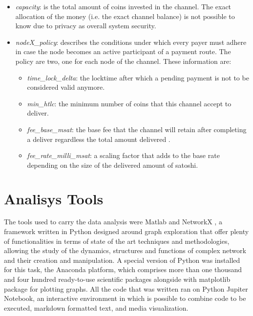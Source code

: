 	\begin{itemize}
		\item \textit{capacity}: is the total amount of coins invested in the channel. The exact allocation of the money (i.e. the exact channel balance) is not possible to know due to privacy as overall system security.
		
		\item \textit{nodeX\_policy}: describes the conditions under which every payer must adhere in case the node becomes an active participant of a payment route. The policy are two, one for each node of the channel. These information are:
		\begin{itemize}
			\item \textit{time\_lock\_delta}: the locktime after which a pending payment is not to be considered valid anymore.
			
			\item \textit{min\_htlc}: the minimum number of coins that this channel accept to deliver.
			
			\item \textit{fee\_base\_msat}: the base fee that the channel will retain after completing a deliver regardless the total amount delivered .
			
			\item \textit{fee\_rate\_milli\_msat}: a scaling factor that adds to the base rate depending on the size of the delivered amount of satoshi.
		\end{itemize}
	\end{itemize}
	
	
	\section{Analisys Tools}
	
	The tools used to carry the data analysis were Matlab and NetworkX \cite{Hagberg2008}, a framework written in Python designed around graph exploration that offer plenty of functionalities in terms of state of the art techniques and methodologies, allowing the study of the dynamics, structures and functions of complex network and their creation and manipulation. A special version of Python was installed for this task, the Anaconda platform, which comprises more than one thousand and four hundred ready-to-use scientific packages alongside with matplotlib package for plotting graphs. All the code that was written ran on Python Jupiter Notebook, an interactive environment in which is possible to combine code to be executed, markdown formatted text, and media visualization.
